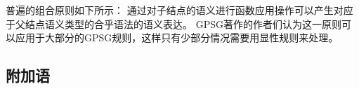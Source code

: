 \noindent
普遍的组合原则如下所示：
\eanoraggedright
通过对子结点的语义进行函数应用操作可以产生对应于父结点语义类型的合乎语法的语义表达。
\z
GPSG著作的作者们认为这一原则可以应用于大部分的GPSG规则，这样只有少部分情况需要用显性规则来处理。

\subsection{附加语}
\label{Abschnitt-Adjunkte-GPSG}

